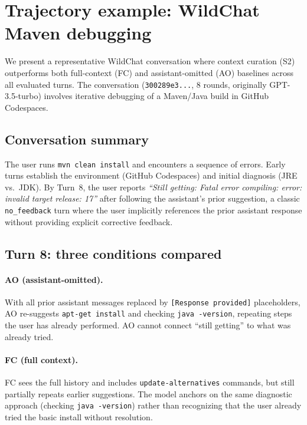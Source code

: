 \documentclass{article} %
\begin{document}
\section{Trajectory example: WildChat Maven debugging}
\label{app:trajectories}

We present a representative WildChat conversation where context curation (S2) outperforms both full-context (FC) and assistant-omitted (AO) baselines across all evaluated turns. The conversation (\texttt{300289e3...}, 8 rounds, originally GPT-3.5-turbo) involves iterative debugging of a Maven/Java build in GitHub Codespaces.

\subsection{Conversation summary}

The user runs \texttt{mvn clean install} and encounters a sequence of errors. Early turns establish the environment (GitHub Codespaces) and initial diagnosis (JRE vs.\ JDK). By Turn~8, the user reports \emph{``Still getting: Fatal error compiling: error: invalid target release: 17''} after following the assistant's prior suggestion, a classic \texttt{no\_feedback} turn where the user implicitly references the prior assistant response without providing explicit corrective feedback.

\subsection{Turn 8: three conditions compared}

\paragraph{AO (assistant-omitted).} With all prior assistant messages replaced by \texttt{[Response provided]} placeholders, AO re-suggests \texttt{apt-get install} and checking \texttt{java -version}, repeating steps the user has already performed. AO cannot connect ``still getting'' to what was already tried.

\paragraph{FC (full context).} FC sees the full history and includes \texttt{update-alternatives} commands, but still partially repeats earlier suggestions. The model anchors on the same diagnostic approach (checking \texttt{java -version}) rather than recognizing that the user already tried the basic install without resolution.
\end{document}
